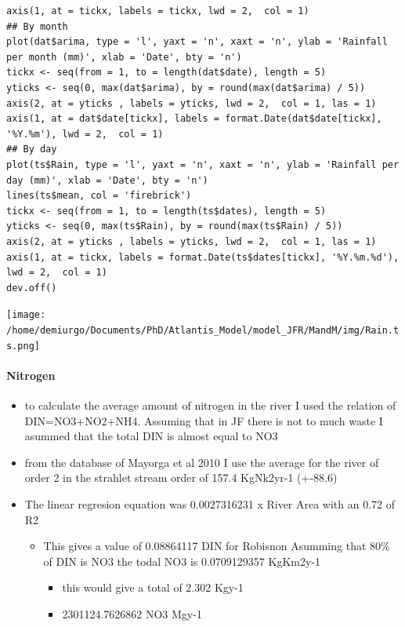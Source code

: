 \documentclass[11pt]{article}
\begin{document}
\begin{verbatim}
axis(1, at = tickx, labels = tickx, lwd = 2,  col = 1)
## By month
plot(dat$arima, type = 'l', yaxt = 'n', xaxt = 'n', ylab = 'Rainfall per month (mm)', xlab = 'Date', bty = 'n')
tickx <- seq(from = 1, to = length(dat$date), length = 5)
yticks <- seq(0, max(dat$arima), by = round(max(dat$arima) / 5))
axis(2, at = yticks , labels = yticks, lwd = 2,  col = 1, las = 1)
axis(1, at = dat$date[tickx], labels = format.Date(dat$date[tickx], '%Y.%m'), lwd = 2,  col = 1)
## By day
plot(ts$Rain, type = 'l', yaxt = 'n', xaxt = 'n', ylab = 'Rainfall per day (mm)', xlab = 'Date', bty = 'n')
lines(ts$mean, col = 'firebrick')
tickx <- seq(from = 1, to = length(ts$dates), length = 5)
yticks <- seq(0, max(ts$Rain), by = round(max(ts$Rain) / 5))
axis(2, at = yticks , labels = yticks, lwd = 2,  col = 1, las = 1)
axis(1, at = tickx, labels = format.Date(ts$dates[tickx], '%Y.%m.%d'), lwd = 2,  col = 1)
dev.off()
\end{verbatim}
     \texttt{[image: /home/demiurgo/Documents/PhD/Atlantis\_Model/model\_JFR/MandM/img/Rain.ts.png]}
\paragraph*{Nitrogen}
\label{sec-5-3-1-4}

\begin{itemize}
\item to calculate the average amount of nitrogen in the river I used the relation of DIN=NO3+NO2+NH4. Assuming that in JF there is not to much waste I asummed that the total DIN is almost equal to NO3
\item from the database of Mayorga et al 2010 I use the average for the river of order 2 in the strahlet stream order of 157.4 KgNk2yr-1 (+-88.6)
\item The linear regresion equation was 0.0027316231 x River Area with an 0.72 of R2
\begin{itemize}
\item This gives a value of 0.08864117 DIN for Robisnon Asumming that 80\% of DIN is NO3 the todal NO3 is 0.0709129357 KgKm2y-1
\begin{itemize}
\item this would give a total of 2.302 Kgy-1
\item 2301124.7626862 NO3 Mgy-1
\end{itemize}
\end{itemize}
\end{itemize}
\end{document}
